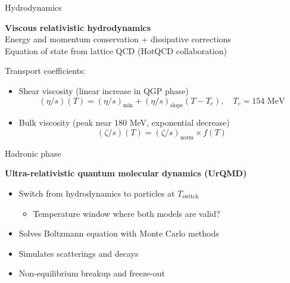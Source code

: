 \documentclass{beamer}
\begin{document}
\begin{frame}[t]{Hydrodynamics}
  \begin{center}
    \textbf{Viscous relativistic hydrodynamics} \\[1ex]
    Energy and momentum conservation + dissipative corrections \\
    Equation of state from lattice QCD (HotQCD collaboration)
  \end{center}
  Transport coefficients:
  \begin{itemize}
    \item Shear viscosity (linear increase in QGP phase)
      \begin{equation*}
        (\eta/s)(T) = (\eta/s)_\text{min} + (\eta/s)_\text{slope} (T - T_c), \quad
        T_c = 154 \text{ MeV}
      \end{equation*}
    \item Bulk viscosity (peak near 180 MeV, exponential decrease)
      \begin{equation*}
        (\zeta/s)(T) = (\zeta/s)_\text{norm} \times f(T)
      \end{equation*}
  \end{itemize}
\end{frame}

\begin{frame}[t]{Hadronic phase}
  \begin{center}
    \textbf{Ultra-relativistic quantum molecular dynamics (UrQMD)}
  \end{center}
  \begin{itemize}
    \item Switch from hydrodynamics to particles at $T_\text{switch}$
      \begin{itemize}
        \item Temperature window where both models are valid?
      \end{itemize}
    \item Solves Boltzmann equation with Monte Carlo methods
    \item Simulates scatterings and decays
    \item Non-equilibrium breakup and freeze-out
  \end{itemize}
\end{frame}

\end{document}
